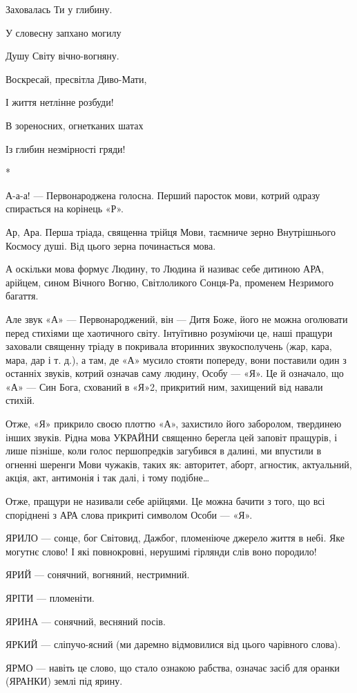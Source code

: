 Заховалась Ти у глибину.

У словесну запхано могилу

Душу Світу вічно-вогняну.

Воскресай, пресвітла Диво-Мати,

І життя нетлінне розбуди!

В зореносних, огнетканих шатах

Із глибин незмірності гряди!

*

А-а-а! — Первонароджена голосна. Перший паросток мови, котрий одразу спирається
на корінець «Р».

Ар, Ара. Перша тріада, священна трійця Мови, таємниче зерно Внутрішнього
Космосу душі. Від цього зерна починається мова.

А оскільки мова формує Людину, то Людина й називає себе дитиною АРА, арійцем,
сином Вічного Вогню, Світлоликого Сонця-Ра, променем Незримого багаття.

Але звук «А» — Первонароджений, він — Дитя Боже, його не можна оголювати перед
стихіями ще хаотичного світу. Інтуїтивно розуміючи це, наші пращури заховали
священну тріаду в покривала вторинних звукосполучень (жар, кара, мара, дар і т.
д.), а там, де «А» мусило стояти попереду, вони поставили один з останніх
звуків, котрий означав саму людину, Особу — «Я». Це й означало, що «А» — Син
Бога, схований в «Я»2, прикритий ним, захищений від навали стихій.

Отже, «Я» прикрило своєю плоттю «А», захистило його заборолом, твердинею інших
звуків. Рідна мова УКРАЙНИ священно берегла цей заповіт пращурів, і лише
пізніше, коли голос першопредків загубився в далині, ми впустили в огненні
шеренги Мови чужаків, таких як: авторитет, аборт, агностик, актуальний, акція,
акт, антимонія і так далі, і тому подібне…

Отже, пращури не називали себе арійцями. Це можна бачити з того, що всі
споріднені з АРА слова прикриті символом Особи — «Я».

ЯРИЛО — сонце, бог Світовид, Дажбог, пломеніюче джерело життя в небі. Яке
могутнє слово! І які повнокровні, нерушимі гірлянди слів воно породило!

ЯРИЙ — сонячний, вогняний, нестримний.

ЯРІТИ — пломеніти.

ЯРИНА — сонячний, весняний посів.

ЯРКИЙ — сліпучо-ясний (ми даремно відмовилися від цього чарівного слова).

ЯРМО — навіть це слово, що стало ознакою рабства, означає засіб для оранки
(ЯРАНКИ) землі під ярину.
